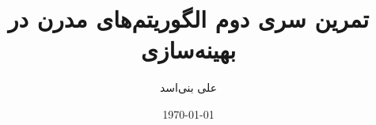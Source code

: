 \documentclass[12pt,onecolumn,a4paper]{article}
\begin{document}
	\title{تمرین سری دوم الگوریتم‌های مدرن در بهینه‌سازی} 
	\author{علی بنی‌اسد}
	\date{\today}
	\maketitle
	
	
	
	
	
	
	
\end{document}
